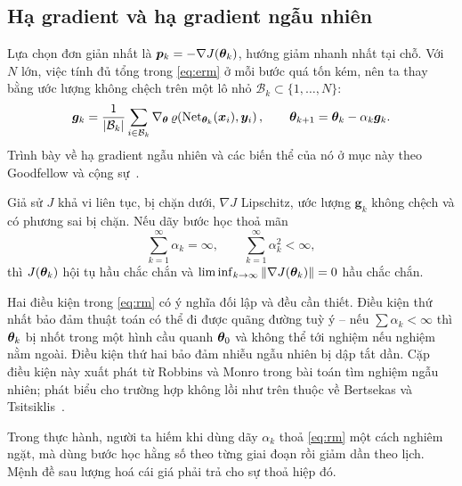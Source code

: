 \subsection{Hạ gradient và hạ gradient ngẫu nhiên}
\label{subsec:sgd}
 
Lựa chọn đơn giản nhất là $\bm{p}_k = -\nabla J(\bm{\theta}_k)$, hướng giảm nhanh
nhất tại chỗ. Với $N$ lớn, việc tính đủ tổng trong \eqref{eq:erm} ở mỗi bước quá
tốn kém, nên ta thay bằng ước lượng không chệch trên một lô nhỏ
$\mathcal{B}_k \subset \{1,\dots,N\}$:
\begin{equation}
\bm{g}_k = \frac{1}{|\mathcal{B}_k|}\sum_{i \in \mathcal{B}_k}
\nabla_{\bm{\theta}}\, \varrho\!\left(\operatorname{Net}_{\bm{\theta}_k}(\bm{x}_i), \bm{y}_i\right),
\qquad
\bm{\theta}_{k+1} = \bm{\theta}_k - \alpha_k \bm{g}_k .
\label{eq:sgd}
\end{equation}
Trình bày về hạ gradient ngẫu nhiên và các biến thể của nó ở mục này theo
Goodfellow và cộng sự~\cite{goodfellow2016}.
 
\begin{dinhly}
\label{dl:robbins-monro}
Giả sử $J$ khả vi liên tục, bị chặn dưới, $\nabla J$ Lipschitz, ước lượng
$\bm{g}_k$ không chệch và có phương sai bị chặn. Nếu dãy bước học thoả mãn
\begin{equation}
\sum_{k=1}^{\infty} \alpha_k = \infty,
\qquad
\sum_{k=1}^{\infty} \alpha_k^2 < \infty,
\label{eq:rm}
\end{equation}
thì $J(\bm{\theta}_k)$ hội tụ hầu chắc chắn và
$\liminf_{k\to\infty}\|\nabla J(\bm{\theta}_k)\| = 0$ hầu chắc chắn.
\end{dinhly}
 
Hai điều kiện trong \eqref{eq:rm} có ý nghĩa đối lập và đều cần thiết. Điều kiện
thứ nhất bảo đảm thuật toán có thể đi được quãng đường tuỳ ý -- nếu
$\sum\alpha_k < \infty$ thì $\bm{\theta}_k$ bị nhốt trong một hình cầu quanh
$\bm{\theta}_0$ và không thể tới nghiệm nếu nghiệm nằm ngoài. Điều kiện thứ hai bảo
đảm nhiễu ngẫu nhiên bị dập tắt dần. Cặp điều kiện này xuất phát từ Robbins và
Monro trong bài toán tìm nghiệm ngẫu nhiên; phát biểu cho trường hợp không lồi
như trên thuộc về Bertsekas và Tsitsiklis~\cite{bertsekas2000}.
 
Trong thực hành, người ta hiếm khi dùng dãy $\alpha_k$ thoả \eqref{eq:rm} một
cách nghiêm ngặt, mà dùng bước học hằng số theo từng giai đoạn rồi giảm dần theo
lịch. Mệnh đề sau lượng hoá cái giá phải trả cho sự thoả hiệp đó.
 
